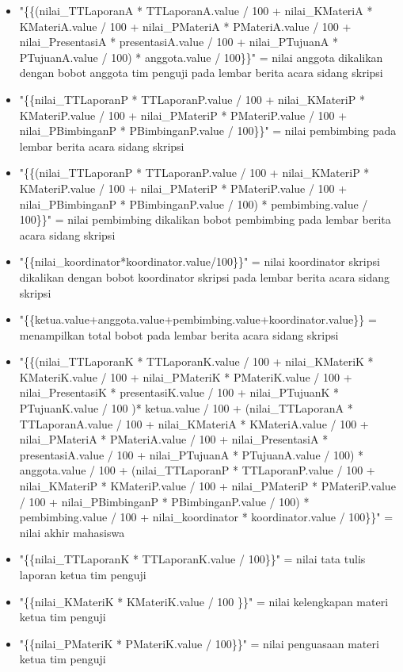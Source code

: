 \begin{itemize}
\begin{itemize}
			\item "\{\{(nilai\_TTLaporanA * TTLaporanA.value / 100 + nilai\_KMateriA * KMateriA.value / 100 + nilai\_PMateriA * PMateriA.value / 100 + nilai\_PresentasiA * presentasiA.value / 100 + nilai\_PTujuanA * PTujuanA.value / 100) * anggota.value / 100\}\}" = nilai anggota dikalikan dengan bobot anggota tim penguji pada lembar berita acara sidang skripsi
			\item "\{\{nilai\_TTLaporanP * TTLaporanP.value / 100 + nilai\_KMateriP * KMateriP.value / 100 + nilai\_PMateriP * PMateriP.value / 100 + nilai\_PBimbinganP * PBimbinganP.value / 100\}\}" = nilai pembimbing pada lembar berita acara sidang skripsi
			\item "\{\{(nilai\_TTLaporanP * TTLaporanP.value / 100 + nilai\_KMateriP * KMateriP.value / 100 + nilai\_PMateriP * PMateriP.value / 100 + nilai\_PBimbinganP * PBimbinganP.value / 100) * pembimbing.value / 100\}\}" = nilai pembimbing dikalikan bobot pembimbing pada lembar berita acara sidang skripsi
			\item "\{\{nilai\_koordinator*koordinator.value/100\}\}" = nilai koordinator skripsi dikalikan dengan bobot koordinator skripsi pada lembar berita acara sidang skripsi
			\item "\{\{ketua.value+anggota.value+pembimbing.value+koordinator.value\}\} = menampilkan total bobot pada lembar berita acara sidang skripsi
			\item "\{\{(nilai\_TTLaporanK * TTLaporanK.value / 100 + nilai\_KMateriK * KMateriK.value / 100 + nilai\_PMateriK * PMateriK.value / 100 + nilai\_PresentasiK * presentasiK.value / 100 + nilai\_PTujuanK * PTujuanK.value / 100 )* ketua.value / 100 + (nilai\_TTLaporanA * TTLaporanA.value / 100 + nilai\_KMateriA * KMateriA.value / 100 + nilai\_PMateriA * PMateriA.value / 100 + nilai\_PresentasiA * presentasiA.value / 100 + nilai\_PTujuanA * PTujuanA.value / 100) * anggota.value / 100 + (nilai\_TTLaporanP * TTLaporanP.value / 100 + nilai\_KMateriP * KMateriP.value / 100 + nilai\_PMateriP * PMateriP.value / 100 + nilai\_PBimbinganP * PBimbinganP.value / 100) * pembimbing.value / 100 + nilai\_koordinator * koordinator.value / 100\}\}" =  nilai akhir mahasiswa
			\item "\{\{nilai\_TTLaporanK * TTLaporanK.value / 100\}\}" = nilai tata tulis laporan ketua tim penguji
			\item "\{\{nilai\_KMateriK * KMateriK.value / 100 \}\}" =  nilai kelengkapan materi ketua tim penguji
			\item "\{\{nilai\_PMateriK * PMateriK.value / 100\}\}"  = nilai penguasaan materi ketua tim penguji

\end{itemize}
\end{itemize}
